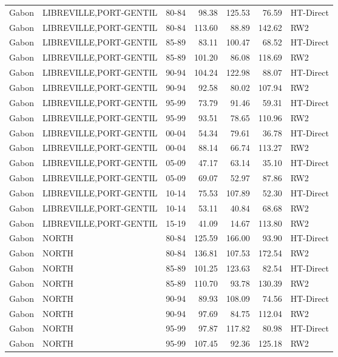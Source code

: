 \begin{longtable}{lllrrrl}
  Gabon & LIBREVILLE,PORT-GENTIL & 80-84 & 98.38 & 125.53 & 76.59 & HT-Direct \\ 
  Gabon & LIBREVILLE,PORT-GENTIL & 80-84 & 113.60 & 88.89 & 142.62 & RW2 \\ 
  Gabon & LIBREVILLE,PORT-GENTIL & 85-89 & 83.11 & 100.47 & 68.52 & HT-Direct \\ 
  Gabon & LIBREVILLE,PORT-GENTIL & 85-89 & 101.20 & 86.08 & 118.69 & RW2 \\ 
  Gabon & LIBREVILLE,PORT-GENTIL & 90-94 & 104.24 & 122.98 & 88.07 & HT-Direct \\ 
  Gabon & LIBREVILLE,PORT-GENTIL & 90-94 & 92.58 & 80.02 & 107.94 & RW2 \\ 
  Gabon & LIBREVILLE,PORT-GENTIL & 95-99 & 73.79 & 91.46 & 59.31 & HT-Direct \\ 
  Gabon & LIBREVILLE,PORT-GENTIL & 95-99 & 93.51 & 78.65 & 110.96 & RW2 \\ 
  Gabon & LIBREVILLE,PORT-GENTIL & 00-04 & 54.34 & 79.61 & 36.78 & HT-Direct \\ 
  Gabon & LIBREVILLE,PORT-GENTIL & 00-04 & 88.14 & 66.74 & 113.27 & RW2 \\ 
  Gabon & LIBREVILLE,PORT-GENTIL & 05-09 & 47.17 & 63.14 & 35.10 & HT-Direct \\ 
  Gabon & LIBREVILLE,PORT-GENTIL & 05-09 & 69.07 & 52.97 & 87.86 & RW2 \\ 
  Gabon & LIBREVILLE,PORT-GENTIL & 10-14 & 75.53 & 107.89 & 52.30 & HT-Direct \\ 
  Gabon & LIBREVILLE,PORT-GENTIL & 10-14 & 53.11 & 40.84 & 68.68 & RW2 \\ 
  Gabon & LIBREVILLE,PORT-GENTIL & 15-19 & 41.09 & 14.67 & 113.80 & RW2 \\ 
  Gabon & NORTH & 80-84 & 125.59 & 166.00 & 93.90 & HT-Direct \\ 
  Gabon & NORTH & 80-84 & 136.81 & 107.53 & 172.54 & RW2 \\ 
  Gabon & NORTH & 85-89 & 101.25 & 123.63 & 82.54 & HT-Direct \\ 
  Gabon & NORTH & 85-89 & 110.70 & 93.78 & 130.39 & RW2 \\ 
  Gabon & NORTH & 90-94 & 89.93 & 108.09 & 74.56 & HT-Direct \\ 
  Gabon & NORTH & 90-94 & 97.69 & 84.75 & 112.04 & RW2 \\ 
  Gabon & NORTH & 95-99 & 97.87 & 117.82 & 80.98 & HT-Direct \\ 
  Gabon & NORTH & 95-99 & 107.45 & 92.36 & 125.18 & RW2 \\ 

\end{longtable}
